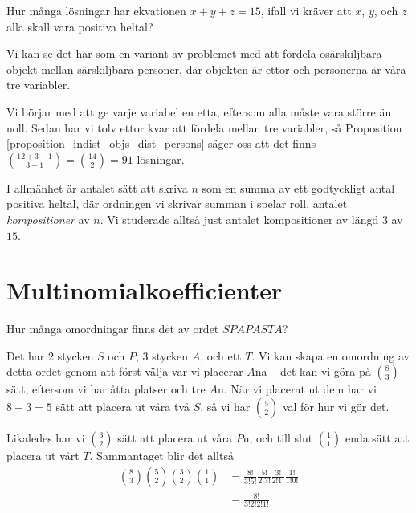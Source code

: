 \documentclass[nobib]{tufte-handout}
\begin{document}
\begin{example}
  Hur många lösningar har ekvationen $x + y + z = 15$, ifall vi kräver att $x$, $y$, och $z$ alla skall vara positiva heltal?

  Vi kan se det här som en variant av problemet med att fördela osärskiljbara objekt mellan särskiljbara personer, där objekten är ettor och personerna är våra tre variabler. 
  
  Vi börjar med att ge varje variabel en etta, eftersom alla måste vara större än noll. Sedan har vi tolv ettor kvar att fördela mellan tre variabler, så Proposition \ref{proposition_indist_objs_dist_persons} säger oss att det finns $\binom{12 + 3 -1}{3 - 1} = \binom{14}{2} = 91$ lösningar.
\end{example}

\begin{definition}
  I allmänhet är antalet sätt att skriva $n$ som en summa av ett godtyckligt antal positiva heltal, där ordningen vi skrivar summan i spelar roll, antalet \emph{kompositioner} av $n$. Vi studerade alltså just antalet kompositioner av längd $3$ av $15$.
\end{definition}

\section{Multinomialkoefficienter}

\begin{example}
  Hur många omordningar finns det av ordet $SPAPASTA$?

  Det har $2$ stycken $S$ och $P$, $3$ stycken $A$, och ett $T$. Vi kan skapa en omordning av detta ordet genom att först välja var vi placerar $A$na -- det kan vi göra på $\binom{8}{3}$ sätt, eftersom vi har åtta platser och tre $A$n. När vi placerat ut dem har vi $8 - 3 = 5$ sätt att placera ut våra två $S$, så vi har $\binom{5}{2}$ val för hur vi gör det.

  Likaledes har vi $\binom{3}{2}$ sätt att placera ut våra $P$n, och till slut $\binom{1}{1}$ enda sätt att placera ut vårt $T$. Sammantaget blir det alltså
  \begin{align*}
    \binom{8}{3}\binom{5}{2}\binom{3}{2}\binom{1}{1} &= \frac{8!}{3!5!}\frac{5!}{2!3!}\frac{3!}{2!1!}\frac{1!}{1!0!}\\
    &= \frac{8!}{3!2!2!1!}
  \end{align*}
\end{example}
\end{document}
